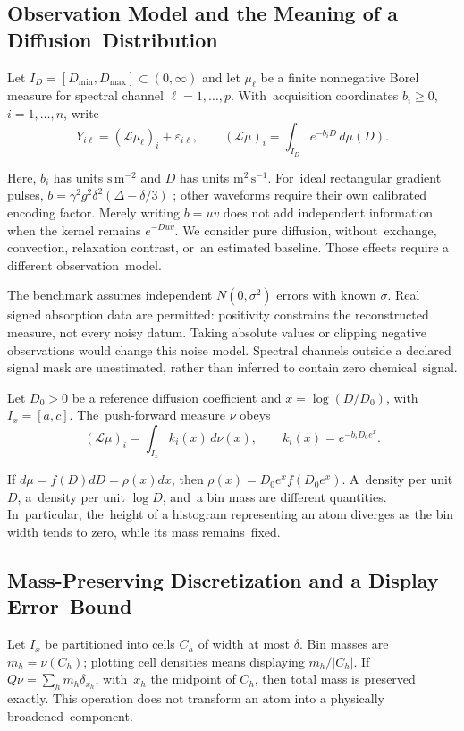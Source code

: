 \documentclass[mathematics,article,accept,moreauthors]{Definitions/mdpi}
\begin{document}
\subsection{Observation Model and the Meaning of a Diffusion~Distribution}
Let 
 $I_D=[D_{\min},D_{\max}]\subset(0,\infty)$ and let $\mu_\ell$ be a finite nonnegative Borel measure for spectral channel $\ell=1,\ldots,p$. With~acquisition coordinates $b_i\geq0$, $i=1,\ldots,n$, write
\begin{equation}\label{eq:measure}
 Y_{i\ell}=(\mathcal L\mu_\ell)_i+\varepsilon_{i\ell},\qquad
 (\mathcal L\mu)_i=\int_{I_D}e^{-b_iD}\,d\mu(D).
\end{equation}

Here, $b_i$ has units $\mathrm{s\,m^{-2}}$ and $D$ has units $\mathrm{m^2\,s^{-1}}$. For~ideal rectangular gradient pulses, $b=\gamma^2g^2\delta^2(\Delta-\delta/3)$ \cite{stejskal}; other waveforms require their own calibrated encoding factor. Merely writing $b=uv$ does not add independent information when the kernel remains $e^{-Duv}$. We consider pure diffusion, without~exchange, convection, relaxation contrast, or~an estimated baseline. Those effects require a different observation~model.

The benchmark assumes independent $N(0,\sigma^2)$ errors with known $\sigma$. Real signed absorption data are permitted: positivity constrains the reconstructed measure, not every noisy datum. Taking absolute values or clipping negative observations would change this noise model. Spectral channels outside a declared signal mask are unestimated, rather than inferred to contain zero chemical~signal.

Let $D_0>0$ be a reference diffusion coefficient and $x=\log(D/D_0)$, with~$I_x=[a,c]$. The~push-forward measure $\nu$ obeys
\begin{equation}\label{eq:log}
 (\mathcal L\mu)_i=\int_{I_x} k_i(x)\,d\nu(x),\qquad
 k_i(x)=e^{-b_iD_0e^x}.
\end{equation}

If $d\mu=f(D)dD=\rho(x)dx$, then $\rho(x)=D_0e^x f(D_0e^x)$. A~density per unit $D$, a~density per unit $\log D$, and~a bin mass are different quantities. In~particular, the~height of a histogram representing an atom diverges as the bin width tends to zero, while its mass remains~fixed.

\subsection{Mass-Preserving Discretization and a Display Error~Bound}
Let $I_x$ be partitioned into cells $C_h$ of width at most $\delta$. Bin masses are $m_h=\nu(C_h)$; plotting cell densities means displaying $m_h/|C_h|$. If~$Q\nu=\sum_h m_h\delta_{x_h}$, with~$x_h$ the midpoint of $C_h$, then total mass is preserved exactly. This operation does not transform an atom into a physically broadened~component.
\end{document}
